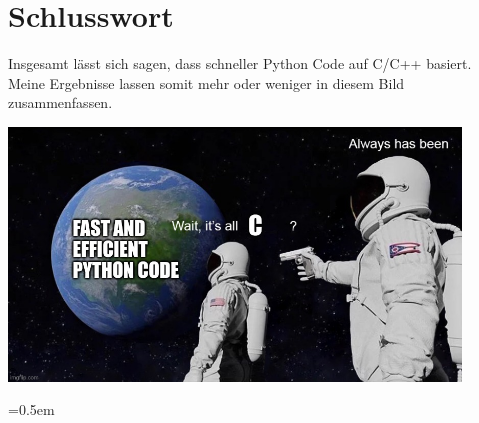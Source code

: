 \documentclass[11pt,a4paper]{article}
\begin{document}
\section{Schlusswort}
Insgesamt lässt sich sagen, dass schneller Python Code auf C/C++ basiert.
Meine Ergebnisse lassen somit mehr oder weniger in diesem Bild zusammenfassen.

\begin{center}
    \includegraphics[width=0.9\textwidth]{diagramme/memepy.jpg}
\end{center}


\clearpage

\emergencystretch=0.5em

\printbibliography[title={Literaturverzeichnis}]
\end{document}
